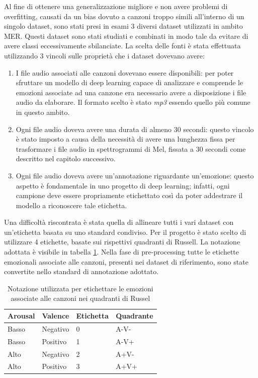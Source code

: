 \documentclass[11pt]{report}
\begin{document}
Al fine di ottenere una generalizzazione migliore e non avere problemi di overfitting, causati da un bias dovuto a canzoni troppo simili all'interno di un singolo dataset, sono stati presi in esami 3 diversi dataset utilizzati in ambito MER. Questi dataset sono stati studiati e combinati in modo tale da evitare di avere classi eccessivamente sbilanciate. La scelta delle fonti è stata effettuata utilizzando 3 vincoli sulle proprietà che i dataset dovevano avere:
\begin{enumerate}

    \item I file audio associati alle canzoni dovevano essere disponibili: per poter sfruttare un modello di deep learning capace di analizzare e comprende le emozioni associate ad una canzone era necessario avere a disposizione i file audio da elaborare. Il formato scelto è stato \textit{mp3} essendo quello più comune in questo ambito.
    
    \item Ogni file audio doveva avere una durata di almeno 30 secondi: questo vincolo è stato imposto a causa della necessità di avere una lunghezza fissa per trasformare i file audio in spettrogrammi di Mel, fissata a 30 secondi come descritto nel capitolo successivo.
    
    \item Ogni file audio doveva avere un'annotazione riguardante un'emozione: questo aspetto è fondamentale in uno progetto di deep learning; infatti, ogni campione deve essere propriamente etichettato così da poter addestrare il modello a riconoscere tale etichetta.
    
\end{enumerate}



Una difficoltà riscontrata è stata quella di allineare tutti i vari dataset con un'etichetta basata su uno standard condiviso. Per il progetto è stato scelto di utilizzare 4 etichette, basate sui rispettivi quadranti di Russell. La notazione adottata è visibile in tabella \ref{tab1}. Nella fase di pre-processing tutte le etichette emozionali associate alle canzoni, presenti nei dataset di riferimento, sono state convertite nello standard di annotazione adottato.

\newpage

\begin{table}
\caption{Notazione utilizzata per etichettare le emozioni associate alle canzoni nei quadranti di Russel}
\label{tab1}
\centering
\begin{tabular}{|l|l|l|l|}
\hline
\textbf{Arousal} &  \textbf{Valence} & \textbf{Etichetta} & \textbf{Quadrante}\\
\hline
Basso &  Negativo & 0 & A-V-\\
Basso & Positivo & 1 & A-V+\\
Alto & Negativo & 2 & A+V-\\
Alto & Positivo & 3 & A+V+\\
\hline
\end{tabular}
\end{table}
\end{document}
